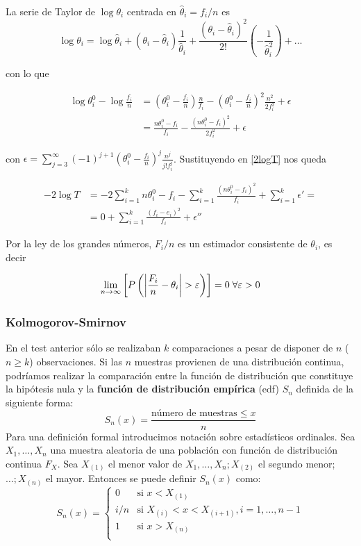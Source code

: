 	La serie de Taylor de $\log \theta_i$ centrada en $\hat{\theta}_i = f_i/n$ es
	\[ \log \theta_i = 
			\log \hat{\theta}_i +
			(\theta_i - \hat{\theta}_i)
				\frac{1}{\hat{\theta}_i} +
			\frac{(\theta_i - \hat{\theta}_i)^2}{2!}
				\left(-\frac{1}{\hat{\theta}_i^2}\right) +
			\dots
	\]
	
	con lo que
	
	\begin{align*}	
	 \log \theta_i^0 - \log \frac{f_i}{n} & = 
			\left(
				\theta_i^0 - \frac{f_i}{n}
			\right) \frac{n}{f_i} -
			\left(
				\theta_i^0 - \frac{f_i}{n}
			\right)^2 \frac{n^2}{2f_i^2} + \epsilon \\
		&= \frac{n\theta_i^0 - f_i}{f_i} -
			\frac{(n\theta_i^0 - f_i)^2}{2f_i^2} +\epsilon
	\end{align*}
	
	con $\epsilon = \sum\limits_{j=3}^\infty
			(-1)^{j+1} 
			\left( \theta_i^0 - \frac{f_i}{n}\right)^j
			\frac{n^j}{j!f_i^j}$. Sustituyendo en \ref{2logT} nos queda
			
	\begin{align*}
	-2 \log T &= 
		-2 \sum\limits_{i=1}^k n\theta_i^0 - f_i -
		\sum\limits_{i=1}^k 
			\frac{(n\theta_i^0 - f_i)^2}{f_i} + 
		\sum\limits_{i=1}^k \epsilon' = \\
	&= 0 + 
	   \sum\limits_{i=1}^k \frac{(f_i-e_i)^2}{f_i} +
	   \epsilon''	
	\end{align*}	 
	
	Por la ley de los grandes números, $F_i/n$ es un estimador consistente de $\theta_i$, es decir
	
	\[ \lim_{n \rightarrow \infty} \left[
			P \left(
				\left\lvert \frac{F_i}{n} - \theta_i \right\rvert 
					> \varepsilon
			\right) \right] = 0 \; \forall \varepsilon > 0 \]
	
	\subsubsection{Kolmogorov-Smirnov}
	
	En el test anterior sólo se realizaban $k$ comparaciones a pesar de disponer de $n$ ($n \geq k$) observaciones. Si las $n$ muestras provienen de una distribución continua, podríamos realizar la comparación entre la función de distribución que constituye la hipótesis nula y la \textbf{función de distribución empírica} (edf) $S_n$ definida de la siguiente forma:
	\[ S_n(x) = \frac{\text{número de muestras} \leq x}{n} \]
	Para una definición formal introducimos notación sobre estadísticos ordinales. Sea $X_1, \dots, X_n$ una muestra aleatoria de una población con función de distribución continua $F_X$. Sea $X_{(1)}$ el menor valor de $X_1, \dots, X_n; X_{(2)}$ el segundo menor;$ \dots; X_{(n)}$ el mayor. Entonces se puede definir $S_n(x)$ como:
	\[ S_n(x) = 
		\left\lbrace\begin{array}{ll}
			0 & \text{si } x < X_{(1)} \\
			i/n & \text{si } X_{(i)} < x <X_{(i+1)},
				i = 1, \dots, n-1 \\
			1 & \text{si } x > X_{(n)} \\
	\end{array}\right.
	\]
	
